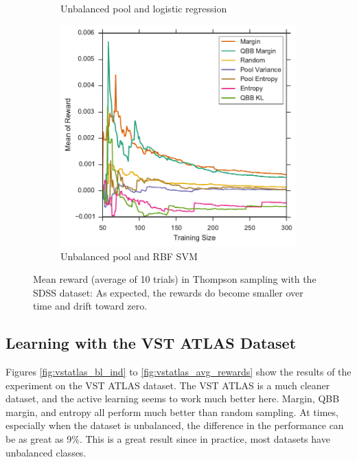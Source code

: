 \begin{figure}[p]
\begin{subfigure}{.5\textwidth}
		\caption{Unbalanced pool and logistic regression}
		\label{fig:sdss_ul_avg_rewards}
	\end{subfigure}%
	\begin{subfigure}{.5\textwidth}
		\centering
		\includegraphics[width=\linewidth]{figures/5_thompson/sdss_ur_avg_rewards}
		\caption{Unbalanced pool and RBF SVM}
		\label{fig:sdss_ur_avg_rewards}
	\end{subfigure}
	\caption[Mean reward of heuristics (SDSS)]{
		Mean reward (average of 10 trials) in Thompson sampling with the SDSS dataset: As expected, the rewards do become smaller over time and drift toward zero.}
	\label{fig:sdss_avg_rewards}
\end{figure}


\subsection{Learning with the VST ATLAS Dataset}
\label{sub:learnvstatlas}

Figures \ref{fig:vstatlas_bl_ind} to \ref{fig:vstatlas_avg_rewards} show the results of the
experiment on the VST ATLAS dataset. The VST ATLAS is a much cleaner dataset, and the active
learning seems to work much better here. Margin, QBB margin, and entropy all perform much better
than random sampling. At times, especially when the dataset is unbalanced, the difference in the
performance can be as great as 9\%. This is a great result since in practice, most datasets have
unbalanced classes.


